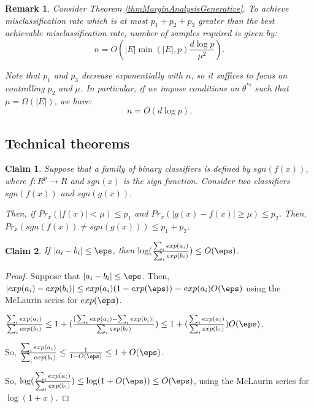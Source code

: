 \documentclass{article}
\newtheorem{claim}{Claim}
\newtheorem{remark}{Remark}
\begin{document}
\begin{remark}
Consider Theorem \ref{thmMarginAnalysisGenerative}. To achieve misclassification rate which is at most $p_1 + p_2 + p_3$ greater than the best achievable misclassification rate, number of samples required is given by:
$$n = O(|E|\min(|E|, p) \frac{d \log p}{\mu^2}).$$

Note that $p_1$ and $p_3$ decrease exponentially with $n$, so it suffices to focus on controlling $p_2$ and $\mu$. In particular, if we impose conditions on $\theta^{*i}$ such that $\mu = \Omega(|E|)$, we have:
$$n = O(d \log p).$$
\end{remark}



\subsection{Technical theorems}
\begin{claim}
\label{lemDisagreement}
Suppose that a family of binary classifiers is defined by $sgn(f(x))$, where $f:R^{p} \to R$ and $sgn(x)$ is the sign function. Consider two classifiers $sgn(f(x))$ and $sgn(g(x))$. 

Then, if $Pr_x(|f(x)| < \mu ) \leq p_1$ and $Pr_x(|g(x) - f(x)| \geq \mu) \leq p_2$. Then, $Pr_x(sgn(f(x)) \neq sgn(g(x))) \leq p_1 + p_2$.
\end{claim}

\begin{claim}
\label{lemLogSumExpBound}
 If $|a_i - b_i| \leq \eps$, then $\log(\frac{\sum_i exp(a_i)}{\sum_i exp(b_i)}) \leq O(\eps)$.
\end{claim}
\begin{proof}
 Suppose that $|a_i - b_i| \leq \eps$. Then, $|exp(a_i) - exp(b_i)| \leq exp(a_i)(1 - exp(\eps)) = exp(a_i)O(\eps)$ using the McLaurin series for $exp(\eps)$.

$\frac{\sum_i exp(a_i)}{\sum_i exp(b_i)} \leq 1 + (\frac{|\sum_i exp(a_i) - \sum_i exp(b_i)|}{\sum_i exp(b_i)}) \leq 1 + (\frac{\sum_i exp(a_i)}{\sum_i exp(b_i)}) O(\eps)$.

So, $\frac{\sum_i exp(a_i)}{\sum_i exp(b_i)} \leq \frac{1}{1 - O(\eps)} \leq 1 + O(\eps)$.

So, $\log(\frac{\sum_i exp(a_i)}{\sum_i exp(b_i)}) \leq \log(1 + O(\eps)) \leq O(\eps)$, using the McLaurin series for $\log(1+x)$.
\end{proof}




\end{document}
